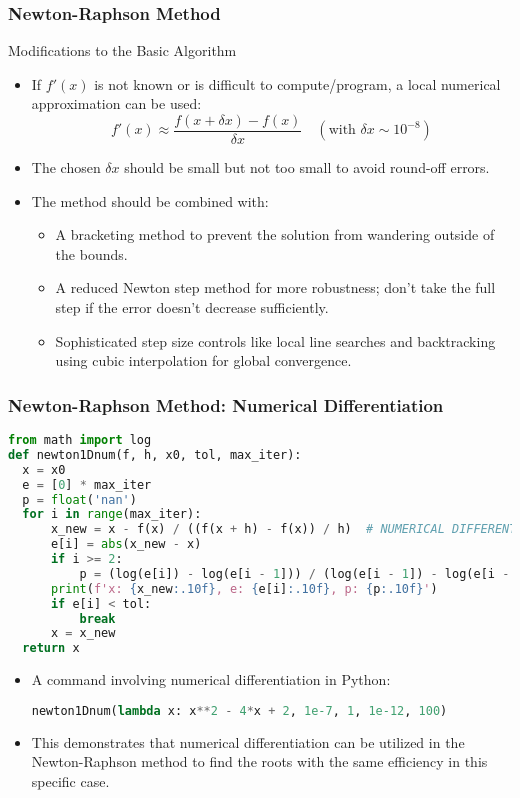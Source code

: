 \begin{frame}[fragile]
    \frametitle{Newton-Raphson Method}

    Modifications to the Basic Algorithm

    \begin{itemize}
        \item If \(f'(x)\) is not known or is difficult to compute/program, a local numerical approximation can be used:
        \[
        f'(x) \approx \frac{f(x+\delta x) - f(x)}{\delta x} \quad (\text{with } \delta x \sim 10^{-8})
        \]
        \item The chosen \(\delta x\) should be small but not too small to avoid round-off errors.
        
        \item The method should be combined with:
        \begin{itemize}
            \item A bracketing method to prevent the solution from wandering outside of the bounds.
            \item A reduced Newton step method for more robustness; don't take the full step if the error doesn't decrease sufficiently.
            \item Sophisticated step size controls like local line searches and backtracking using cubic interpolation for global convergence.
        \end{itemize}
    \end{itemize}
\end{frame}

\begin{frame}[fragile]
  \frametitle{Newton-Raphson Method: Numerical Differentiation}
  
  \begin{lstlisting}[language=Python]
from math import log
def newton1Dnum(f, h, x0, tol, max_iter):
  x = x0
  e = [0] * max_iter
  p = float('nan')
  for i in range(max_iter):
      x_new = x - f(x) / ((f(x + h) - f(x)) / h)  # NUMERICAL DIFFERENTIATION
      e[i] = abs(x_new - x)
      if i >= 2:
          p = (log(e[i]) - log(e[i - 1])) / (log(e[i - 1]) - log(e[i - 2]))
      print(f'x: {x_new:.10f}, e: {e[i]:.10f}, p: {p:.10f}')
      if e[i] < tol:
          break
      x = x_new
  return x
  \end{lstlisting}
  \begin{itemize}
      \item A command involving numerical differentiation in Python:
      \begin{lstlisting}[language=Python]
newton1Dnum(lambda x: x**2 - 4*x + 2, 1e-7, 1, 1e-12, 100)
      \end{lstlisting}
      \item This demonstrates that numerical differentiation can be utilized in the Newton-Raphson method to find the roots with the same efficiency in this specific case.
  \end{itemize}
\end{frame}

